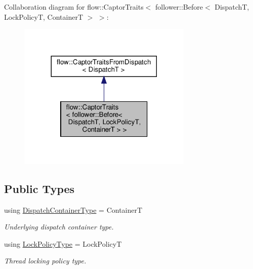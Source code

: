Collaboration diagram for flow\+:\+:Captor\+Traits$<$ follower\+:\+:Before$<$ DispatchT, Lock\+PolicyT, ContainerT $>$ $>$\+:
\nopagebreak
\begin{figure}[H]
\begin{center}
\leavevmode
\includegraphics[width=236pt]{structflow_1_1_captor_traits_3_01follower_1_1_before_3_01_dispatch_t_00_01_lock_policy_t_00_01_c8abc3cfc8771d56fd0e17e883ddf3ce0}
\end{center}
\end{figure}
\subsection*{Public Types}
\begin{DoxyCompactItemize}
\item 
\mbox{\label{structflow_1_1_captor_traits_3_01follower_1_1_before_3_01_dispatch_t_00_01_lock_policy_t_00_01_container_t_01_4_01_4_ac31ecf45e08d5d7b6e50a2b9861760f5}} 
using \hyperlink{structflow_1_1_captor_traits_3_01follower_1_1_before_3_01_dispatch_t_00_01_lock_policy_t_00_01_container_t_01_4_01_4_ac31ecf45e08d5d7b6e50a2b9861760f5}{Dispatch\+Container\+Type} = ContainerT
\begin{DoxyCompactList}\small\item\em Underlying dispatch container type. \end{DoxyCompactList}\item 
\mbox{\label{structflow_1_1_captor_traits_3_01follower_1_1_before_3_01_dispatch_t_00_01_lock_policy_t_00_01_container_t_01_4_01_4_acc5d152634c4895901033df409cfbdb1}} 
using \hyperlink{structflow_1_1_captor_traits_3_01follower_1_1_before_3_01_dispatch_t_00_01_lock_policy_t_00_01_container_t_01_4_01_4_acc5d152634c4895901033df409cfbdb1}{Lock\+Policy\+Type} = Lock\+PolicyT
\begin{DoxyCompactList}\small\item\em Thread locking policy type. \end{DoxyCompactList}\end{DoxyCompactItemize}


